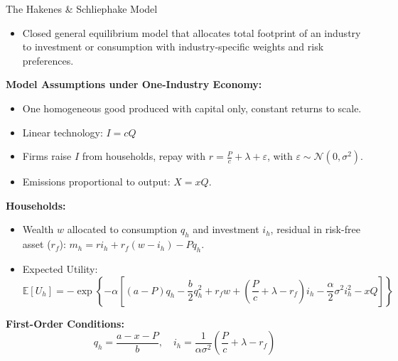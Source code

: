 \documentclass{beamer}
\begin{document}
\begin{frame}{The Hakenes \& Schliephake Model}
\footnotesize
\vspace{-2.5em}
\begin{itemize}
\item Closed general equilibrium model that allocates total footprint of an industry to investment or consumption with industry-specific weights and risk preferences.

\end{itemize}

\pause
\vspace{0.4em}
\textbf{Model Assumptions under One-Industry Economy:}
\begin{itemize}
  \item One homogeneous good produced with capital only, constant returns to scale.
  \item Linear technology: \( I = c Q \)
  \item Firms raise \(I\) from households, repay with \(r = \frac{P}{c} + \lambda + \varepsilon\), with \(\varepsilon \sim \mathcal{N}(0,\sigma^2)\).
  \item Emissions proportional to output: \( X = x Q \).
\end{itemize}

\pause
\textbf{Households:}
\begin{itemize}
  \item Wealth \(w\) allocated to consumption \(q_h\) and investment \(i_h\), residual in risk-free asset (\(r_f\)): $m_h = r i_h + r_f(w - i_h) - P q_h $.
  
  \item Expected Utility:  
  \[
  \mathbb{E}[U_h] = -\exp\left\{ -\alpha \left[ (a - P)q_h - \frac{b}{2}q_h^2 + r_f w + \left( \frac{P}{c} + \lambda - r_f \right)i_h - \frac{\alpha}{2}\sigma^2 i_h^2 - xQ \right] \right\} 
  \]
\end{itemize}

\pause
\textbf{First-Order Conditions:}
\[
q_h = \frac{a - x - P}{b}, \quad 
i_h = \frac{1}{\alpha\sigma^2}\left(\frac{P}{c} + \lambda - r_f\right)
\]
\end{frame}
\end{document}

